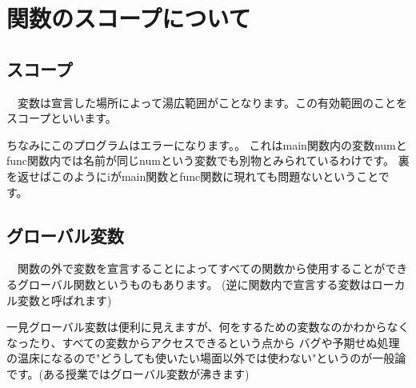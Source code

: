 ﻿\section{関数のスコープについて}
\subsection{スコープ}
　変数は宣言した場所によって湯広範囲がことなります。この有効範囲のことをスコープといいます。

ちなみにこのプログラムはエラーになります。。
これはmain関数内の変数numとfunc関数内では名前が同じnumという変数でも別物とみられているわけです。
裏を返せばこのようにiがmain関数とfunc関数に現れても問題ないということです。


\subsection{グローバル変数}
　関数の外で変数を宣言することによってすべての関数から使用することができるグローバル関数というものもあります。
(逆に関数内で宣言する変数はローカル変数と呼ばれます)

一見グローバル変数は便利に見えますが、何をするための変数なのかわからなくなったり、すべての変数からアクセスできるという点から
バグや予期せぬ処理の温床になるので"どうしても使いたい場面以外では使わない"というのが一般論です。(ある授業ではグローバル変数が沸きます)
